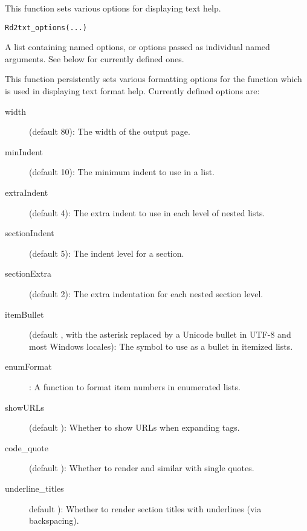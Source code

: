%
\begin{Description}\relax
This function sets various options for displaying text help.
\end{Description}
%
\begin{Usage}
\begin{verbatim}
Rd2txt_options(...)
\end{verbatim}
\end{Usage}
%
\begin{Arguments}
\begin{ldescription}
\item[\code{...}] A list containing named options, or 
options passed as individual named arguments.  
See below for currently defined ones.
\end{ldescription}
\end{Arguments}
%
\begin{Details}\relax
This function persistently sets various formatting options for the
 function which is used in displaying text format
help.  Currently defined options are:
\begin{description}

\item[width] (default 80):  The width of the output page.
\item[minIndent] (default 10):  The minimum indent to use in a list.
\item[extraIndent] (default 4):  The extra indent to use in each
level of nested lists.
\item[sectionIndent] (default 5):  The indent level for a section.
\item[sectionExtra] (default 2):  The extra indentation for each
nested section level.
\item[itemBullet] (default , with the asterisk replaced by a
Unicode bullet in UTF-8 and most Windows locales):
The symbol to use as a bullet in itemized lists.
\item[enumFormat] :  A function to format item numbers in enumerated lists.
\item[showURLs] (default ):  Whether to show URLs when
expanding  tags.
\item[code\_quote] (default ):  Whether to render
 and similar with single quotes.
\item[underline\_titles] default ):  Whether to render
section titles with underlines (via backspacing).

\end{description}

\end{Details}
